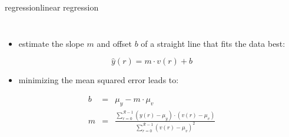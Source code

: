         \begin{frame}{regression}{linear regression}
             \vspace{-3mm}
             \begin{columns}
                   \begin{itemize}
                        \item   estimate the slope $m$ and offset $b$ of a straight line that fits the data best:
                            \begin{footnotesize}
                            \begin{equation*}
                                \hat{y}(r) = m\cdot v(r) + b
                            \end{equation*} 
                        \end{footnotesize}
                        \bigskip
                        \item   minimizing the mean squared error leads to:
                            \begin{footnotesize}
                            \begin{eqnarray*}
                                b &=& \mu_y - m\cdot \mu_v \\
                                m &=& \frac{\sum\limits_{r=0}^{\mathcal{R}-1}\left(y(r)- \mu_y\right)\cdot \left(v(r) - \mu_v\right)}{\sum\limits_{r=0}^{\mathcal{R}-1}\left(v(r) - \mu_v\right)^2}
                            \end{eqnarray*}
                        \end{footnotesize}
                    \end{itemize}
                \vspace{-10mm}
            \end{columns}
        \end{frame}
        
